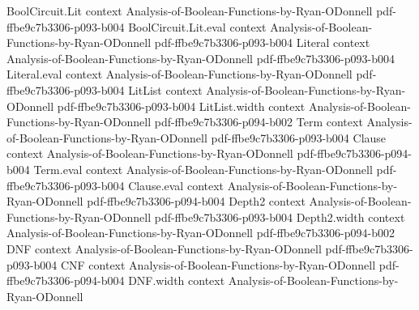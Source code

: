 \begin{theorem}
\leanok
{}
\proofstep
  {BoolCircuit.Lit}
  {context}
  {Analysis-of-Boolean-Functions-by-Ryan-ODonnell}
  {pdf-ffbe9c7b3306-p093-b004}
\proofstep
  {BoolCircuit.Lit.eval}
  {context}
  {Analysis-of-Boolean-Functions-by-Ryan-ODonnell}
  {pdf-ffbe9c7b3306-p093-b004}
\proofstep
  {Literal}
  {context}
  {Analysis-of-Boolean-Functions-by-Ryan-ODonnell}
  {pdf-ffbe9c7b3306-p093-b004}
\proofstep
  {Literal.eval}
  {context}
  {Analysis-of-Boolean-Functions-by-Ryan-ODonnell}
  {pdf-ffbe9c7b3306-p093-b004}
\proofstep
  {LitList}
  {context}
  {Analysis-of-Boolean-Functions-by-Ryan-ODonnell}
  {pdf-ffbe9c7b3306-p093-b004}
\proofstep
  {LitList.width}
  {context}
  {Analysis-of-Boolean-Functions-by-Ryan-ODonnell}
  {pdf-ffbe9c7b3306-p094-b002}
\proofstep
  {Term}
  {context}
  {Analysis-of-Boolean-Functions-by-Ryan-ODonnell}
  {pdf-ffbe9c7b3306-p093-b004}
\proofstep
  {Clause}
  {context}
  {Analysis-of-Boolean-Functions-by-Ryan-ODonnell}
  {pdf-ffbe9c7b3306-p094-b004}
\proofstep
  {Term.eval}
  {context}
  {Analysis-of-Boolean-Functions-by-Ryan-ODonnell}
  {pdf-ffbe9c7b3306-p093-b004}
\proofstep
  {Clause.eval}
  {context}
  {Analysis-of-Boolean-Functions-by-Ryan-ODonnell}
  {pdf-ffbe9c7b3306-p094-b004}
\proofstep
  {Depth2}
  {context}
  {Analysis-of-Boolean-Functions-by-Ryan-ODonnell}
  {pdf-ffbe9c7b3306-p093-b004}
\proofstep
  {Depth2.width}
  {context}
  {Analysis-of-Boolean-Functions-by-Ryan-ODonnell}
  {pdf-ffbe9c7b3306-p094-b002}
\proofstep
  {DNF}
  {context}
  {Analysis-of-Boolean-Functions-by-Ryan-ODonnell}
  {pdf-ffbe9c7b3306-p093-b004}
\proofstep
  {CNF}
  {context}
  {Analysis-of-Boolean-Functions-by-Ryan-ODonnell}
  {pdf-ffbe9c7b3306-p094-b004}
\proofstep
  {DNF.width}
  {context}
  {Analysis-of-Boolean-Functions-by-Ryan-ODonnell}

\end{theorem}

